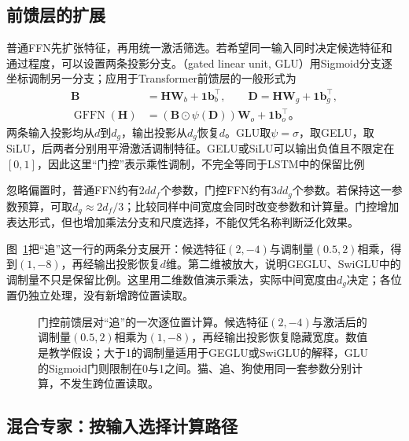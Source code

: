 \subsection{前馈层的扩展}
\label{sec:transformer-ffn-extensions}

普通FFN先扩张特征，再用统一激活筛选。若希望同一输入同时决定候选特征和通过程度，可以设置两条投影分支。（gated linear unit, GLU）用Sigmoid分支逐坐标调制另一分支；应用于Transformer前馈层的一般形式为
\begin{equation}
  \begin{aligned}
    \bm B&=\bm H\bm W_b+\bm1\bm b_b^{\top},\qquad
    \bm D=\bm H\bm W_g+\bm1\bm b_g^{\top},\\
    \operatorname{GFFN}(\bm H)&=(\bm B\odot\psi(\bm D))\bm W_o
                          +\bm1\bm b_o^{\top}\text{。}
  \end{aligned}
  \label{eq:transformer-gated-ffn}
\end{equation}
两条输入投影均从$d$到$d_g$，输出投影从$d_g$恢复$d$。GLU取$\psi=\sigma$，取GELU，取SiLU，后两者分别用平滑激活调制特征。GELU或SiLU可以输出负值且不限定在$[0,1]$，因此这里“门控”表示乘性调制，不完全等同于LSTM中的保留比例

忽略偏置时，普通FFN约有$2dd_f$个参数，门控FFN约有$3dd_g$个参数。若保持这一参数预算，可取$d_g\approx2d_f/3$；比较同样中间宽度会同时改变参数和计算量。门控增加表达形式，但也增加乘法分支和尺度选择，不能仅凭名称判断泛化效果。

图~\ref{fig:transformer-gated-ffn}把“追”这一行的两条分支展开：候选特征$(2,-4)$与调制量$(0.5,2)$相乘，得到$(1,-8)$，再经输出投影恢复$d$维。第二维被放大，说明GEGLU、SwiGLU中的调制量不只是保留比例。这里用二维数值演示乘法，实际中间宽度由$d_g$决定；各位置仍独立处理，没有新增跨位置读取。

\begin{figure}[htbp]
  \centering
  
  \caption{门控前馈层对“追”的一次逐位置计算。候选特征$(2,-4)$与激活后的调制量$(0.5,2)$相乘为$(1,-8)$，再经输出投影恢复隐藏宽度。数值是教学假设；大于1的调制量适用于GEGLU或SwiGLU的解释，GLU的Sigmoid门则限制在0与1之间。猫、追、狗使用同一套参数分别计算，不发生跨位置读取。}
  \label{fig:transformer-gated-ffn}
\end{figure}
\FloatBarrier

\subsection{混合专家：按输入选择计算路径}
\label{sec:transformer-moe-extensions}

